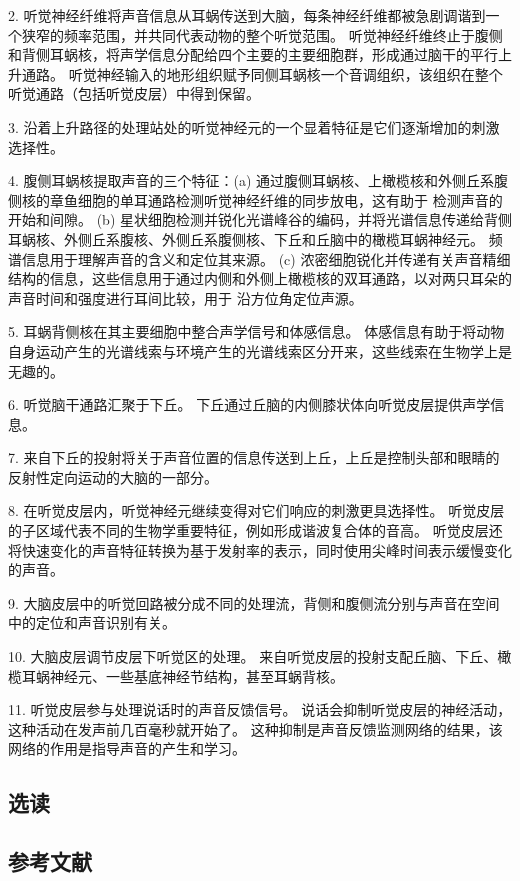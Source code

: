2. 听觉神经纤维将声音信息从耳蜗传送到大脑，每条神经纤维都被急剧调谐到一个狭窄的频率范围，并共同代表动物的整个听觉范围。 听觉神经纤维终止于腹侧和背侧耳蜗核，将声学信息分配给四个主要的主要细胞群，形成通过脑干的平行上升通路。 听觉神经输入的地形组织赋予同侧耳蜗核一个音调组织，该组织在整个听觉通路（包括听觉皮层）中得到保留。 

3. 沿着上升路径的处理站处的听觉神经元的一个显着特征是它们逐渐增加的刺激选择性。 

4. 腹侧耳蜗核提取声音的三个特征：(a) 通过腹侧耳蜗核、上橄榄核和外侧丘系腹侧核的章鱼细胞的单耳通路检测听觉神经纤维的同步放电，这有助于 检测声音的开始和间隙。 (b) 星状细胞检测并锐化光谱峰谷的编码，并将光谱信息传递给背侧耳蜗核、外侧丘系腹核、外侧丘系腹侧核、下丘和丘脑中的橄榄耳蜗神经元。 频谱信息用于理解声音的含义和定位其来源。 (c) 浓密细胞锐化并传递有关声音精细结构的信息，这些信息用于通过内侧和外侧上橄榄核的双耳通路，以对两只耳朵的声音时间和强度进行耳间比较，用于 沿方位角定位声源。 

5. 耳蜗背侧核在其主要细胞中整合声学信号和体感信息。 体感信息有助于将动物自身运动产生的光谱线索与环境产生的光谱线索区分开来，这些线索在生物学上是无趣的。 

6. 听觉脑干通路汇聚于下丘。 下丘通过丘脑的内侧膝状体向听觉皮层提供声学信息。 

7. 来自下丘的投射将关于声音位置的信息传送到上丘，上丘是控制头部和眼睛的反射性定向运动的大脑的一部分。 

8. 在听觉皮层内，听觉神经元继续变得对它们响应的刺激更具选择性。 听觉皮层的子区域代表不同的生物学重要特征，例如形成谐波复合体的音高。 听觉皮层还将快速变化的声音特征转换为基于发射率的表示，同时使用尖峰时间表示缓慢变化的声音。 

9. 大脑皮层中的听觉回路被分成不同的处理流，背侧和腹侧流分别与声音在空间中的定位和声音识别有关。 

10. 大脑皮层调节皮层下听觉区的处理。 来自听觉皮层的投射支配丘脑、下丘、橄榄耳蜗神经元、一些基底神经节结构，甚至耳蜗背核。 

11. 听觉皮层参与处理说话时的声音反馈信号。 说话会抑制听觉皮层的神经活动，这种活动在发声前几百毫秒就开始了。 这种抑制是声音反馈监测网络的结果，该网络的作用是指导声音的产生和学习。


\subsection{选读}
\subsection{参考文献}
